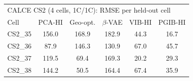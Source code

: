 \begin{tabular}{l c c c c c}
\hline
\multicolumn{6}{l}{CALCE CS2 (4 cells, 1C/1C): RMSE per held-out cell}\\
 Cell & PCA-HI & Geo-opt. & $\beta$-VAE & VIB-HI & PGIB-HI \\
\hline
CS2\_35 & 156.0 & 168.9 & 182.9 & 44.3 & 16.7 \\
CS2\_36 & 87.9 & 146.3 & 130.9 & 67.0 & 45.7 \\
CS2\_37 & 119.5 & 69.4 & 169.3 & 20.2 & 29.3 \\
CS2\_38 & 144.2 & 50.5 & 164.4 & 67.4 & 35.9 \\
\hline
\end{tabular}
